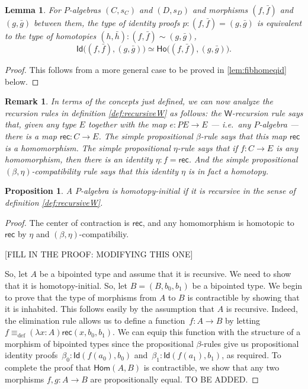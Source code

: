 \documentclass[reqno,10pt,a4paper,oneside]{amsart}
\numberwithin{equation}{section}
\theoremstyle{mythm}
\newtheorem{lemma}[theorem]{Lemma}
\newtheorem{proposition}[theorem]{Proposition}
\theoremstyle{mydef}
\theoremstyle{myrmk}
\newtheorem{remark}[theorem]{Remark}
\newcommand{\deq}{\equiv}
\newcommand{\defeq}{\deq_{\mathrm{def}}}
\newcommand{\co}{\colon}
\newcommand{\Id}{\mathsf{Id}}
\newcommand{\W}{\mathsf{W}}
\newcommand{\rec}{\mathsf{rec}}
\newcommand{\Hom}{\mathsf{Hom}}
\newcommand{\Ho}{\mathsf{Ho}}
\begin{document}
\begin{lemma}\label{IdEqHo}
For $P$-algebras $(C,s_C)$ and $(D,s_D)$ and morphisms $(f, \bar{f})$ and $(g, \bar{g})$ between them, the type of identity proofs $p : (f, \bar{f}) = (g, \bar{g})$ is equivalent to the type of homotopies $(h, \bar{h}) : (f, \bar{f}) \sim (g, \bar{g})$,
\[
\Id\big((f, \bar{f}), (g, \bar{g})\big) \simeq \Ho\big((f, \bar{f}), (g, \bar{g})\big).
\]
\end{lemma}

\begin{proof}
This follows from a more general case to be proved in \ref{lem:fibhomeqid} below.
\end{proof}

\begin{remark}\label{rem:explainrules}
In terms of the concepts just defined, we can now analyze the recursion rules in definition \ref{def:recursiveW} as follows: the $\W$-recursion rule says that, given any type $E$ together with the map $e : PE\to E$ --- i.e.\ any $P$-algebra --- there is a map $\rec : C\to E$.  The simple propositional $\beta$-rule says that this map $\rec$ is a homomorphism.  The simple propositional $\eta$-rule says that if $f : C\to E$ is any homomorphism, then there is an identity $\eta : f = \rec$.  And the simple propositional $(\beta, \eta)$-compatibility rule says that this identity $\eta$ is in fact a homotopy.
\end{remark}

\begin{proposition}\label{prop:Wrec2hinit}
A $P$-algebra is homotopy-initial if it is recursive in the sense of definition \ref{def:recursiveW}.
\end{proposition}

\begin{proof}
The center of contraction is $\rec$, and any homomorphism is homotopic to $\rec$ by $\eta$ and $(\beta,\eta)$-compatibiliy.

[FILL IN THE PROOF: MODIFYING THIS ONE]

So, let $A$ be a bipointed type
and assume that it is recursive. We need to show that it is homotopy-initial. So, let $B = (B, b_0, b_1)$ be a bipointed type. We begin to prove
that the type of morphisms from $A$ to $B$ is contractible by showing that it is inhabited. This follows easily by the assumption that $A$
is recursive. Indeed, the elimination rule allows us to define a function~$f \co A \to B$ by letting~$f \defeq (\lambda x \co A) \rec(x, b_0, b_1)$. We can
equip this function with the structure of a morphism of bipointed types since the propositional $\beta$-rules give us propositional identity 
proofs~$\beta_0 \co \Id(f (a_0), b_0)$ and~$\beta_1 \co \Id (f(a_1), b_1)$, as required. To complete the proof that $\Hom(A,B)$ is contractible,
we show that any two morphisms $f, g \co A \to B$ are propositionally equal.  TO BE ADDED.
\end{proof}
\end{document}
